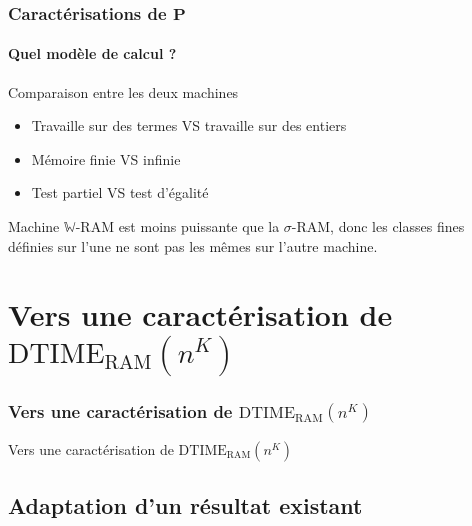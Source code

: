 \documentclass[10pt]{beamer}
\newcommand{\bbW}{\mathbb{W}}
\newcommand{\dtimeram}{\text{DTIME}_{\text{RAM}}\left( n^K \right)}
\begin{document}
	
	\begin{frame}
		\frametitle{Caractérisations de $\textbf{P}$}
		\framesubtitle{Quel modèle de calcul ?}
		
		\begin{block}{Comparaison entre les deux machines}
			\begin{itemize}
				\item 	Travaille sur des termes VS travaille sur des entiers
				\item 	Mémoire finie VS infinie
				\item 	Test partiel VS test d'égalité
			\end{itemize}
			
			
			Machine $\bbW$-RAM est moins puissante que la $\sigma$-RAM, donc les classes fines définies sur l'une ne sont pas les mêmes sur l'autre machine.
			
		\end{block}
	\end{frame}
	
	
	
	
	
	\section{Vers une caractérisation de $\dtimeram$}

			
	
	\begin{frame}
		\frametitle{Vers une caractérisation de $\dtimeram$}
		\begin{center}
			\Large
			Vers une caractérisation de $\dtimeram$
		\end{center}
	\end{frame}
	
	\subsection{Adaptation d'un résultat existant}
	
\end{document}
